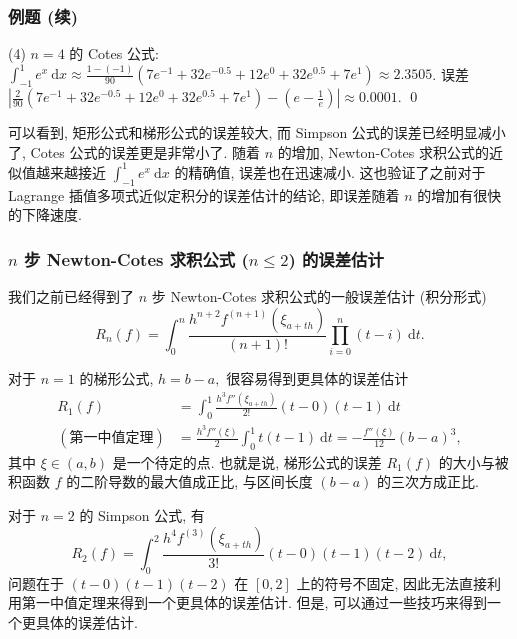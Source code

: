 
\begin{frame}
\frametitle{例题 (续)}

(4) $n = 4$ 的 Cotes 公式: $\int_{-1}^1 e^x ~ \mathrm{d}x \approx \frac{1 - (-1)}{90} \left( 7 e^{-1} + 32 e^{-0.5} + 12 e^0 + 32 e^{0.5} + 7 e^1 \right) \approx 2.3505$. 误差 $\left|\frac{2}{90} \left( 7 e^{-1} + 32 e^{-0.5} + 12 e^0 + 32 e^{0.5} + 7 e^1 \right) - (e - \frac{1}{e})\right| \approx 0.0001$.
\qed

\pause
\vspace{0.5em}

可以看到, 矩形公式和梯形公式的误差较大, 而 Simpson 公式的误差已经明显减小了, Cotes 公式的误差更是非常小了. 随着 $n$ 的增加, Newton-Cotes 求积公式的近似值越来越接近 $\int_{-1}^1 e^x ~ \mathrm{d}x$ 的精确值, 误差也在迅速减小. 这也验证了之前对于 Lagrange 插值多项式近似定积分的误差估计的结论, 即误差随着 $n$ 的增加有很快的下降速度.

\end{frame}


\begin{frame}
\frametitle{$n$ 步 Newton-Cotes 求积公式 ($n \leqslant 2$) 的误差估计}

我们之前已经得到了 $n$ 步 Newton-Cotes 求积公式的一般误差估计 (积分形式)
\[
R_n(f) = \int_0^n \frac{h^{n+2} f^{(n+1)}(\xi_{a+th})}{(n+1)!} \prod_{i=0}^n (t - i) ~ \mathrm{d}t.
\]

\pause

对于 $n = 1$ 的梯形公式, $h = b - a,$ 很容易得到更具体的误差估计
\begin{align*}
R_1(f) & = \int_0^1 \frac{h^3 f''(\xi_{a+th})}{2!} (t - 0)(t - 1) ~ \mathrm{d}t \\
(\text{第一中值定理}) & = \frac{h^3 f''(\xi)}{2} \int_0^1 t(t-1) ~ \mathrm{d}t = -\frac{f''(\xi)}{12} (b-a)^3,
\end{align*}
其中 $\xi \in (a, b)$ 是一个待定的点. 也就是说, 梯形公式的误差 $R_1(f)$ 的大小与被积函数 $f$ 的二阶导数的最大值成正比, 与区间长度 $(b-a)$ 的三次方成正比.

\pause
\vspace{0.5em}

对于 $n = 2$ 的 Simpson 公式, 有
\[
R_2(f) = \int_0^2 \frac{h^4 f^{(3)}(\xi_{a+th})}{3!} (t - 0)(t - 1)(t - 2) ~ \mathrm{d}t,
\]
问题在于 $(t - 0)(t - 1)(t - 2)$ 在 $[0, 2]$ 上的符号不固定, 因此无法直接利用第一中值定理来得到一个更具体的误差估计. 但是, 可以通过一些技巧来得到一个更具体的误差估计.

\end{frame}

